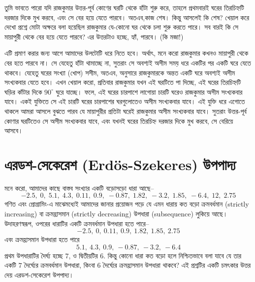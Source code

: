 \begin{solution}
	তুমি ভাবতে পারো যদি রাজকুমার উত্তর-পূর্ব কোণের ঘরটি থেকে হাঁটা শুরু করে, তাহলে প্রথমবারই ঘরের তিরচিহ্নটি দরজার দিকে মুখ করবে, এবং সে বের হয়ে যেতে পারবে। অতএব,কাজ শেষ। কিন্তু আসলেই কি শেষ? খেয়াল করে দেখো প্রশ্নে মোটা অক্ষরে বলা হয়েছিল রাজকুমার যে-কোনো ঘর থেকে চলা শুরু করতে পারে। সব বারই কি সে মায়াপুরী থেকে বের হয়ে যেতে পারবে? এর উত্তরটাও হচ্ছে, হ্যাঁ, পারবে। (কি মজা!)

	এটি প্রমাণ করার জন্য আগে আমাদের উলটোটি ধরে নিতে হবে। অর্থাৎ, মনে করো রাজকুমার কখনও মায়াপুরী থেকে বের হতে পারবে না। সে যেহেতু হাঁটা থামাচ্ছে না, সুতরাং সে অবশ্যই অসীম সময় ধরে একটির পর একটি ঘরে যেতে থাকবে। যেহেতু ঘরের সংখ্যা (খোপ) সসীম, অতএব, \phpname{} অনুসারে রাজকুমারকে অন্তত একটি ঘরে অবশ্যই অসীম সংখ্যকবার যেতে হবে। এখন খেয়াল করো, প্রতিবার রাজকুমার যখন এই ঘরটিতে পা দিচ্ছে, এই ঘরের তিরচিহ্নটি ঘড়ির কাঁটার দিকে $90^\circ$ ঘুরে যাচ্ছে। ফলে, এই ঘরের চারপাশে লাগোয়া চারটি ঘরেও রাজকুমার অসীম সংখ্যকবার যাবে। একই যুক্তিতে সে এই চারটি ঘরের চারপাশের ঘরগুলোতেও অসীম সংখ্যকবার যাবে। এই যুক্তি ধরে এগোতে থাকলে আমরা আসলে বুঝতে পারব যে মায়াপুরীর প্রতিটা ঘরেই রাজকুমার অসীম সংখ্যকবার যাবে। সুতরাং উত্তর-পূর্ব কোণার ঘরটিতেও সে অসীম সংখ্যকবার যাবে, এবং যখনই ঘরের তিরচিহ্ন দরজার দিকে মুখ করবে, সে বেরিয়ে আসবে।
\end{solution}

\section{এরডশ-সেকেরেশ (Erdös-Szekeres) উপপাদ্য}
মনে করো, আমাদের কাছে বাস্তব সংখ্যার একটি বড়োসড়ো ধারা আছে--
\[-2.5,\;0,\;5.1,\;4.3,\;0.11,\;0.9,\;-0.87,\;1.82,\;-3.2,\;1.85,\;-6.4,\;12,\;2.75\]
গণিত এবং প্রোগ্রামিং-এ মাঝেমধ্যেই আমাদের জানার প্রয়োজন পড়ে যে এমন ধারায় কত বড়ো ক্রমবর্ধমান (strictly increasing) বা ক্রমহ্রাসমান (strictly decreasing) উপধারা (subsequence) লুকিয়ে আছে। উদাহরণস্বরূপ, ওপরের ধারাটির একটি ক্রমবর্ধমান উপধারা হতে পারে--
\[-2.5,\ 0,\ 0.11,\ 0.9,\ 1.82,\ 1.85,\ 2.75\]
এবং ক্রমহ্রাসমান উপধারা হতে পারে
\[5.1,\ 4.3,\ 0.9,\ -0.87,\ -3.2,\ -6.4\]
প্রথম উপধারাটির দৈর্ঘ্য হচ্ছে $7$, ও দ্বিতীয়টির $6$. কিন্তু কোনো ধারা কত বড়ো হলে নিশ্চিতভাবে বলা যাবে যে তার একটি $7$ দৈর্ঘ্যের ক্রমবর্ধমান উপধারা, কিংবা $6$ দৈর্ঘ্যের ক্রমহ্রাসমান উপধারা থাকবে? এই প্রশ্নটির একটি চমৎকার উত্তর দেয় এরডশ-সেকেরেশ উপপাদ্য।

